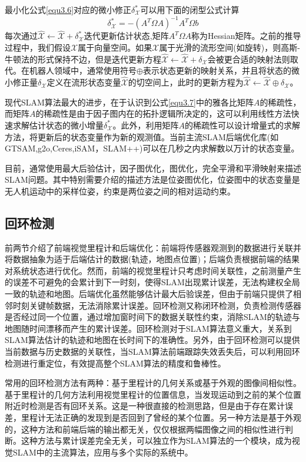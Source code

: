 最小化公式\eqref{equ3.6}对应的微小修正$\delta_\mathcal{X}^* $可以用下面的闭型公式计算
\begin{equation}
\label{equ3.7}
\delta_\mathcal{X}^* = - \left( A^T \Omega A \right)^{-1} A^T \Omega b
\end{equation}
每次通过$\hat{\mathcal{X}} \leftarrow \hat{\mathcal{X}}+\delta_\mathcal{X}^*$迭代更新估计状态,矩阵$A^T \Omega A$称为Hessian矩阵。之前的推导过程中，我们假设$\mathcal{X}$属于向量空间。如果$\mathcal{X}$属于光滑的流形空间(如旋转)，则高斯-牛顿法的形式保持不边，但是迭代更新方程$\hat{\mathcal{X}} \leftarrow \hat{\mathcal{X}}+\delta_\mathcal{X}$会被更合适的映射法则取代。在机器人领域中，通常使用符号$\oplus$表示状态更新的映射关系，并且将状态的微小修正量$\delta_\mathcal{X}$定义在流形状态变量$\hat{\mathcal{X}}$的切空间上，此时的更新方程为$\hat{\mathcal{X}}  \leftarrow \hat{\mathcal{X}} \oplus \delta_\mathcal{X}$。

现代SLAM算法最大的进步，在于认识到公式\eqref{equ3.7}中的雅各比矩阵$A$的稀疏性，而矩阵$A$的稀疏性是由于因子图内在的拓扑逻辑所决定的，这可以利用线性方法快速求解估计状态的微小增量$\delta_\mathcal{X}^*$。此外，利用矩阵$A$的稀疏性可以设计增量式的求解方法，将更新后的状态变量作为新的观测值。当前主流SLAM后端优化库(如GTSAM,g2o,Ceres,iSAM，SLAM++)可以在几秒之内求解数以万计的状态变量。

目前，通常使用最大后验估计，因子图优化，图优化，完全平滑和平滑映射来描述SLAM问题。其中特别需要介绍的描述方法是位姿图优化，位姿图中的状态变量是无人机运动中的采样位姿，约束是两位姿之间的相对运动约束。

\subsection{回环检测}
前两节介绍了前端视觉里程计和后端优化：前端将传感器观测到的数据进行关联并将数据抽象为适于后端估计的数据(轨迹，地图点位置)；后端负责根据前端的结果对系统状态进行优化。然而，前端的视觉里程计只考虑时间关联性，之前测量产生的误差不可避免的会累计到下一时刻，使得SLAM出现累计误差，无法构建权全局一致的轨迹和地图。后端优化虽然能够估计最大后验误差，但由于前端只提供了相邻时刻关键帧数据，无法消除累计误差。回环检测又称闭环检测，负责检测传感器是否经过同一个位置，通过增加窗时间下的数据关联性约束，消除SLAM的轨迹与地图随时间漂移而产生的累计误差。回环检测对于SLAM算法意义重大，关系到SLAM算法估计的轨迹和地图在长时间下的准确性。另外，由于回环检测可以提供当前数据与历史数据的关联性，当SLAM算法前端跟踪失效丢失后，可以利用回环检测进行重定位，有效提高整个SLAM算法的精度和鲁棒性。

常用的回环检测方法有两种：基于里程计的几何关系或基于外观的图像间相似性。基于里程计的几何方法利用视觉里程计的位置信息，当发现运动到之前的某个位置附近时检测是否有回环关系。这是一种很直接的检测思路，但是由于存在累计误差，里程计无法正确的发现到是否回到了曾经的某个位置。另一种方法是基于外观的，这种方法和前端后端的输出都无关，仅仅根据两幅图像之间的相似性进行判断。这种方法与累计误差完全无关，可以独立作为SLAM算法的一个模块，成为视觉SLAM中的主流算法，应用与多个实际的系统中。



